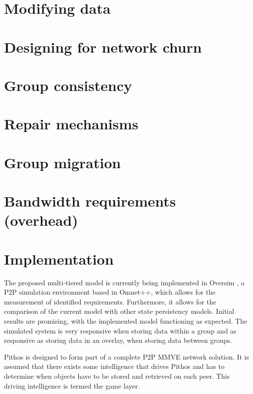     \section{Modifying data}

    \section{Designing for network churn}

    \section{Group consistency}

    \section{Repair mechanisms}

    \section{Group migration}
    
        \section{Bandwidth requirements (overhead)}

    \section{Implementation}
    The proposed multi-tiered model is currently being implemented in Oversim \cite{OverSim_2007}, a P2P simulation environment based in Omnet++, which
allows for the measurement of identified requirements. Furthermore, it allows for the comparison of the current model with other state persistency
models. Initial results are promising, with the implemented model functioning as expected. The simulated system is very responsive when storing data
within a group and as responsive as storing data in an overlay, when storing data between groups.

Pithos is designed to form part of a complete P2P MMVE network solution. It is assumed that there exists some intelligence that drives Pithos and has
to determine when objects have to be stored and retrieved on each peer. This driving intelligence is termed the game layer.

